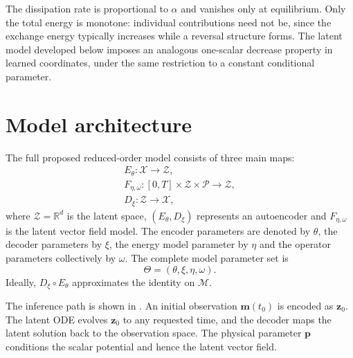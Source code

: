 \documentclass[a4paper,11pt]{article}
\newcommand{\m}{\bm m}
\newcommand{\z}{\bm z}
\newcommand{\p}{\bm p}
\newcommand{\Eenc}{E_{\theta}}
\newcommand{\Ddec}{D_{\xi}}
\begin{document}
The dissipation rate is proportional to $\alpha$ and vanishes only at equilibrium.
Only the total energy is monotone: individual contributions need not be, since the
exchange energy typically increases while a reversal structure forms. The latent
model developed below imposes an analogous one-scalar decrease property in learned
coordinates, under the same restriction to a constant conditional parameter.

\section{Model architecture}
The full proposed reduced-order model consists of three main maps:
\begin{align}
    \Eenc:\mathcal{X} \rightarrow \mathcal{Z},\\
    F_{\eta,\omega}:[0, T] \times \mathcal{Z} \times \mathcal{P} \rightarrow \mathcal{Z},\\
    \Ddec: \mathcal{Z} \rightarrow \mathcal{X},
\end{align}
where $\mathcal{Z} = \mathbb{R}^d$ is the latent space, $(\Eenc, \Ddec)$ represents an autoencoder and $F_{\eta,\omega}$ is the latent vector field model. The encoder parameters are denoted by $\theta$, the decoder parameters by $\xi$, the energy model parameter by $\eta$ and the operator parameters collectively by $\omega$. The complete model parameter set is 
\begin{equation}
    \Theta = (\theta, \xi, \eta, \omega).
\end{equation}
Ideally, $\Ddec\circ\Eenc$ approximates the identity on $\mathcal M$.

The inference path is shown in . An initial observation
$\m(t_0)$ is encoded as $\z_0$. The latent ODE evolves $\z_0$ to any requested
time, and the decoder maps the latent solution back to the observation space.
The physical parameter $\p$ conditions the scalar potential and hence the
latent vector field.
\end{document}

